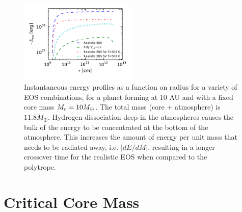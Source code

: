 \documentclass[apj]{emulateapj}
\begin{document}
\begin{figure}[h]
\centering
\includegraphics[width=0.5\textwidth]{../../figs/ModelAtmospheres/RadSelfGravRealEOS/PaperFigs/Er_plot.pdf}
\caption{Instantaneous energy profiles as a function on radius for a variety of EOS combinations, for a planet forming at 10 AU and with a fixed core mass $M_{\rm c}=10 M_{\oplus}$. The total mass (core + atmosphere) is $11.8 M_{\oplus}$. Hydrogen dissociation deep in the atmospheres causes the bulk of the energy to be concentrated at the bottom of the atmosphere. This increases the amount of energy per unit mass that needs to be radiated away, i.e. $|dE/dM|$, resulting in a longer crossover time for the realistic EOS when compared to the polytrope.}
\label{fig:Erplot}
\end{figure}







\section{Critical Core Mass}
\label{critical}

\end{document}
